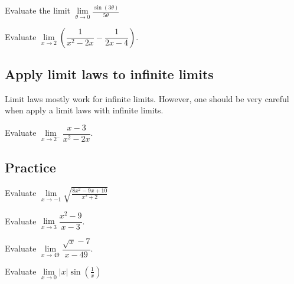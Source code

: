 \begin{example}
Evaluate the limit
\(\lim\limits_{\theta\to 0}\frac{\sin(3\theta)}{5\theta}\)
\end{example}
\vspace*{6\baselineskip}

\begin{example}
Evaluate
\(\lim\limits_{x\to 2}\left(\dfrac1{x^2-2x}-\dfrac{1}{2x-4}\right)\).
\end{example}
\vspace*{6\baselineskip}

\subsection{Apply limit laws to infinite
limits}

Limit laws mostly work for infinite limits. However, one should be very
careful when apply a limit laws with infinite limits.

\begin{example}
Evaluate \(\lim\limits_{x\to2^-}\dfrac{x-3}{x^2-2x}\).
\end{example}
\vspace*{6\baselineskip}

\subsection{Practice}

\begin{exercise}
  Evaluate
  \(\lim\limits_{x\to -1}\sqrt{\frac{8x^2-9x+10}{x^2+2}}\)
  \end{exercise}
  \vspace*{6\baselineskip}

\begin{exercise}
Evaluate \(\lim\limits_{x\to 3}\dfrac{x^2-9}{x-3}\).
\end{exercise}
\vspace*{6\baselineskip}

\begin{exercise}
Evaluate
\(\lim\limits_{x\to 49}\dfrac{\sqrt{x}-7}{x-49}\).
\end{exercise}
\vspace*{6\baselineskip}

\begin{exercise}
Evaluate
\(\lim\limits_{x\to 0}\lvert x\rvert \sin\left(\frac{1}{x}\right)\)
\end{exercise}
\vspace*{6\baselineskip}

